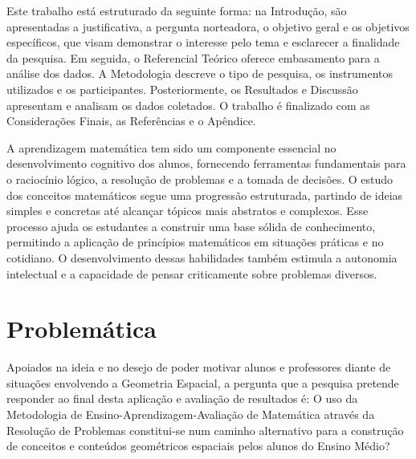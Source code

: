 Este trabalho está estruturado da seguinte forma: na Introdução, são apresentadas a justificativa, a pergunta norteadora, o objetivo geral e os objetivos específicos, que visam demonstrar o interesse pelo tema e esclarecer a finalidade da pesquisa. Em seguida, o Referencial Teórico oferece embasamento para a análise dos dados. A Metodologia descreve o tipo de pesquisa, os instrumentos utilizados e os participantes. Posteriormente, os Resultados e Discussão apresentam e analisam os dados coletados. O trabalho é finalizado com as Considerações Finais, as Referências e o Apêndice.

A aprendizagem matemática tem sido um componente essencial no desenvolvimento cognitivo dos alunos, fornecendo ferramentas fundamentais para o raciocínio lógico, a resolução de problemas e a tomada de decisões. O estudo dos conceitos matemáticos segue uma progressão estruturada, partindo de ideias simples e concretas até alcançar tópicos mais abstratos e complexos. Esse processo ajuda os estudantes a construir uma base sólida de conhecimento, permitindo a aplicação de princípios matemáticos em situações práticas e no cotidiano. O desenvolvimento dessas habilidades também estimula a autonomia intelectual e a capacidade de pensar criticamente sobre problemas diversos.


\section{Problemática}

Apoiados na ideia e no desejo de poder motivar alunos e professores diante de situações envolvendo a Geometria Espacial, a pergunta que a pesquisa pretende responder ao final desta aplicação e avaliação de resultados é: O uso da Metodologia de Ensino-Aprendizagem-Avaliação de Matemática através da Resolução de Problemas constitui-se num caminho alternativo para a construção de conceitos e conteúdos geométricos espaciais pelos alunos do Ensino Médio?


